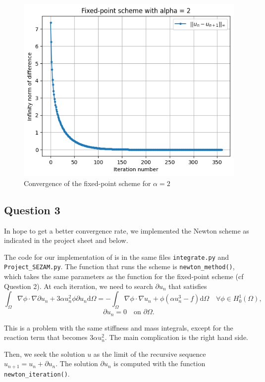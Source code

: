\documentclass[11pt, a4paper, twoside]{article}
\newcommand{\grad}{\nabla} %
\newcommand{\Hunz}{H^1_0(\Omega)}
\newcommand{\intom}{\int_\Omega}
\renewcommand{\d}{\text{d}}
\begin{document}
\begin{figure}[H]
\centering
\includegraphics[scale = 0.7]{../Figures/fixed_conv_alpha2.png}
\caption{Convergence of the fixed-point scheme for $\alpha=2$}
\label{q2fig4}
\end{figure}


\subsection*{Question 3}
In hope to get a better convergence rate, we implemented the Newton scheme as indicated in the project sheet and below.

The code for our implementation of is in the same files \verb+integrate.py+ and \verb+Project_SEZAM.py+. The function that runs the scheme is \verb+newton_method()+, which takes the same parameters as the function for the fixed-point scheme (cf Question 2).
At each iteration, we need to search $\partial u_n$ that satisfies 
$$\intom \grad \phi \cdot \grad \partial u_n + 3\alpha u_n^2 \phi \partial u_n \d\Omega = - \intom \grad \phi \cdot \grad u_n + \phi (\alpha u_n^3 - f) \d\Omega \quad \forall \phi\in \Hunz, $$
$$\partial u_n = 0 \quad \text{on } \partial\Omega.$$

This is a problem with the same stiffness and mass integrals, except for the reaction term that becomes $3\alpha u_n^2$. The main complication is the right hand side.

Then, we seek the solution $u$ as the limit of the recursive sequence $u_{n+1} =u_n + \partial u_n$.
The solution $\partial u_n$ is computed with the function \verb+newton_iteration()+.
\end{document}
